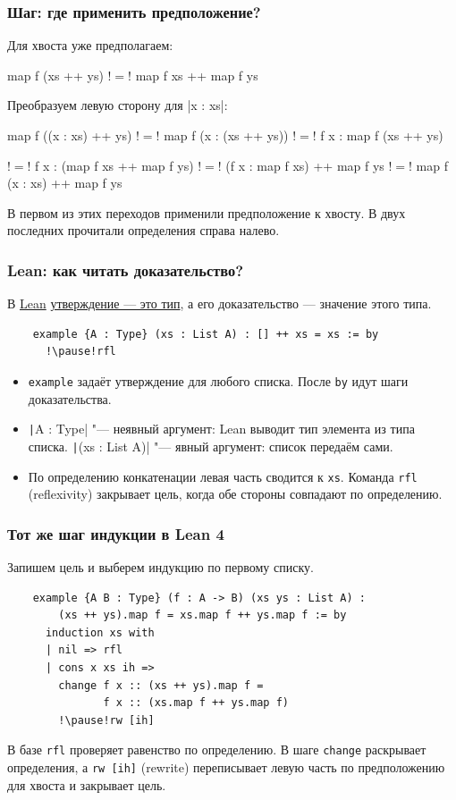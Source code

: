 \documentclass[11pt]{beamer}
\begin{document}
\begin{frame}[fragile]
  \frametitle{Шаг: где применить предположение?}
  Для хвоста уже предполагаем:
  \begin{haskellsmall}
    map f (xs ++ ys) !$=$! map f xs ++ map f ys
  \end{haskellsmall}
  Преобразуем левую сторону для \haskinline|x : xs|:
  \begin{haskellsmall}
      map f ((x : xs) ++ ys)
    !$=$! map f (x : (xs ++ ys))
    !$=$! f x : map f (xs ++ ys)
  \end{haskellsmall}
  \pause
  \begin{haskellsmall}
    !$=$! f x : (map f xs ++ map f ys)
    !$=$! (f x : map f xs) ++ map f ys
    !$=$! map f (x : xs) ++ map f ys
  \end{haskellsmall}
  В первом из этих переходов применили предположение к хвосту. В двух последних прочитали определения справа налево.
\end{frame}

\begin{frame}[fragile]
  \frametitle{Lean: как читать доказательство?}
  В \href{https://lean-lang.org/}{Lean} \href{https://homepages.inf.ed.ac.uk/wadler/papers/propositions-as-types/propositions-as-types.pdf}{утверждение — это тип}, а его доказательство — значение этого типа.
  \begin{verbatim}
    example {A : Type} (xs : List A) : [] ++ xs = xs := by
      !\pause!rfl
  \end{verbatim}
  \begin{itemize}
    \item \texttt{example} задаёт утверждение для любого списка. После \texttt{by} идут шаги доказательства.
    \item \texttt|{A : Type}| "--- неявный аргумент: Lean выводит тип элемента из типа списка. \texttt|(xs : List A)| "--- явный аргумент: список передаём сами.
    \item По определению конкатенации левая часть сводится к \texttt{xs}. Команда \texttt{rfl} (reflexivity) закрывает цель, когда обе стороны совпадают по определению.
  \end{itemize}
\end{frame}

\begin{frame}[fragile]
  \frametitle{Тот же шаг индукции в Lean 4}
  Запишем цель и выберем индукцию по первому списку.
  \begin{verbatim}
    example {A B : Type} (f : A -> B) (xs ys : List A) :
        (xs ++ ys).map f = xs.map f ++ ys.map f := by
      induction xs with
      | nil => rfl
      | cons x xs ih =>
        change f x :: (xs ++ ys).map f =
               f x :: (xs.map f ++ ys.map f)
        !\pause!rw [ih]
  \end{verbatim}
  В базе \texttt{rfl} проверяет равенство по определению.
  В шаге \texttt{change} раскрывает определения, а \texttt{rw [ih]} (rewrite) переписывает левую часть по предположению для хвоста и закрывает цель.
\end{frame}
\end{document}
